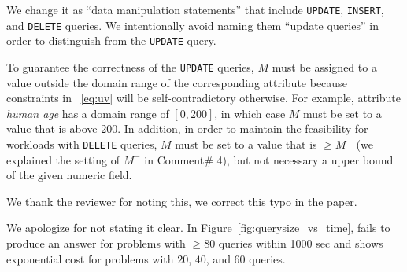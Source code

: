 
\begin{quote}
\end{quote}

We change it as ``data manipulation statements'' that include \texttt{UPDATE},
\texttt{INSERT}, and \texttt{DELETE} queries. We intentionally avoid naming 
them ``update queries'' in order to distinguish from the \texttt{UPDATE} query. 



\begin{quote}
\end{quote}

To guarantee the correctness of the \texttt{UPDATE} queries, $M$ must 
be assigned to a value outside the domain range of the corresponding attribute 
because constraints in ~\ref{eq:uv} will be self-contradictory otherwise. For example, 
attribute \textit{human age} has a domain range of $[0, 200]$, in which case $M$ must be 
set to a value that is above $200$. 
In addition, in order to maintain the feasibility for workloads with \texttt{DELETE}
queries, $M$ must be set to a value that is $\geq M^-$ (we explained
the setting of $M^-$ in Comment\# 4), but not necessary a 
upper bound of the given numeric field. 



\begin{quote}
\end{quote}

We thank the reviewer for noting this, we correct this typo in the paper. 


\begin{quote}
\end{quote}
We apologize for not stating it clear. In Figure~\ref{fig:querysize_vs_time}, \naive fails to produce an answer
 for problems with $\geq 80$ queries within 1000 sec and \naive shows exponential cost for problems with $20$, $40$, and $60$ queries. 


